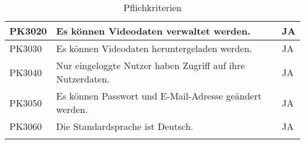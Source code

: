 \begin{longtable}{p{} | p{} | p{}}
   \\
  \hline 
  PK3020 & Es können Videodaten verwaltet werden. & JA
   \\
  \hline 
  PK3030 & Es können Videodaten heruntergeladen werden. & JA
   \\
  \hline 
  PK3040 & Nur eingeloggte Nutzer haben Zugriff auf ihre Nutzerdaten. & JA
   \\
  \hline 
  PK3050 & Es können Passwort und E-Mail-Adresse geändert werden. & JA
   \\
  \hline 
  PK3060 & Die Standardsprache ist Deutsch. & JA
  \\
  \hline
  \caption{Pflichkriterien}
 \end{longtable}
 